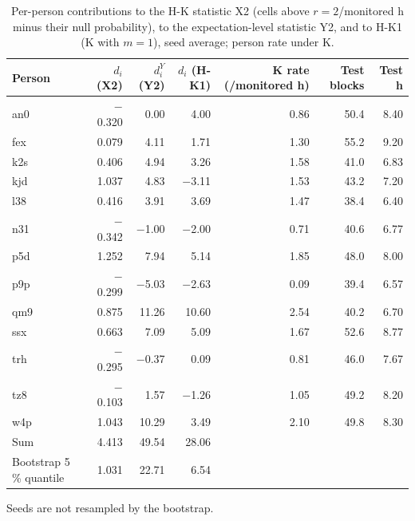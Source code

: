\begin{table}[htbp]
\centering
\scriptsize\setlength{\tabcolsep}{4pt}
\caption{Per-person contributions to the H-K statistic X2 (cells above $r = 2$/monitored h minus their null probability), to the expectation-level statistic Y2, and to H-K1 (K with $m = 1$), seed average; person rate under K.}\label{tab:hk}
\begin{tabular}{lrrrrrr}
\toprule
Person & $d_i$ (X2) & $d^Y_i$ (Y2) & $d_i$ (H-K1) & K rate (/monitored h) & Test blocks & Test h \\
\midrule
an0 & $-$0.320 & 0.00 & 4.00 & 0.86 & 50.4 & 8.40 \\
fex & 0.079 & 4.11 & 1.71 & 1.30 & 55.2 & 9.20 \\
k2s & 0.406 & 4.94 & 3.26 & 1.58 & 41.0 & 6.83 \\
kjd & 1.037 & 4.83 & $-$3.11 & 1.53 & 43.2 & 7.20 \\
l38 & 0.416 & 3.91 & 3.69 & 1.47 & 38.4 & 6.40 \\
n31 & $-$0.342 & $-$1.00 & $-$2.00 & 0.71 & 40.6 & 6.77 \\
p5d & 1.252 & 7.94 & 5.14 & 1.85 & 48.0 & 8.00 \\
p9p & $-$0.299 & $-$5.03 & $-$2.63 & 0.09 & 39.4 & 6.57 \\
qm9 & 0.875 & 11.26 & 10.60 & 2.54 & 40.2 & 6.70 \\
ssx & 0.663 & 7.09 & 5.09 & 1.67 & 52.6 & 8.77 \\
trh & $-$0.295 & $-$0.37 & 0.09 & 0.81 & 46.0 & 7.67 \\
tz8 & $-$0.103 & 1.57 & $-$1.26 & 1.05 & 49.2 & 8.20 \\
w4p & 1.043 & 10.29 & 3.49 & 2.10 & 49.8 & 8.30 \\
\midrule Sum & 4.413 & 49.54 & 28.06 &  &  &  \\
Bootstrap 5\,\% quantile & 1.031 & 22.71 & 6.54 &  &  &  \\
\bottomrule
\end{tabular}
\par\smallskip\begin{minipage}{0.95\linewidth}\scriptsize {} Seeds are not resampled by the bootstrap.\end{minipage}
\end{table}
